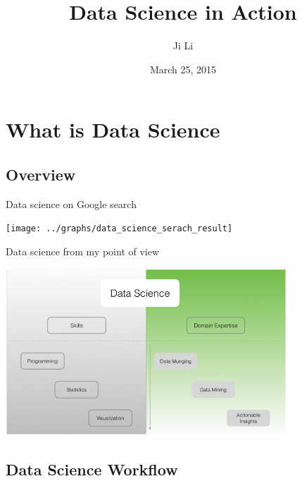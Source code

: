 \documentclass[10pt]{beamer}
\title[Data Science In Action]{Data Science in Action}
\author[JL]{Ji Li}
\institute[Ji Li]{Data Scientist}
\date{March 25, 2015}
\begin{document}
\frame{\titlepage}


\section{What is Data Science}

  \subsection{Overview}

    \begin{frame}{Data science on Google search}
      \begin{center}
        \texttt{[image: ../graphs/data\_science\_serach\_result]}
      \end{center}
    \end{frame}

    \begin{frame}{Data science from my point of view}
      \begin{center}
        \includegraphics[width=300pt]{../graphs/data_science_structure}
      \end{center}
    \end{frame}

  \subsection{Data Science Workflow}
\end{document}
